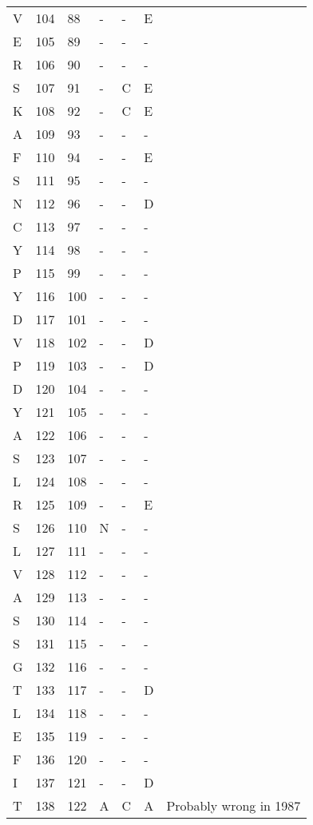 \begin{longtable}{lllllll}
  V & 104 & 88 & - & - & E &  \\ 
  E & 105 & 89 & - & - & - &  \\ 
  R & 106 & 90 & - & - & - &  \\ 
  S & 107 & 91 & - & C & E &  \\ 
  K & 108 & 92 & - & C & E &  \\ 
  A & 109 & 93 & - & - & - &  \\ 
  F & 110 & 94 & - & - & E &  \\ 
  S & 111 & 95 & - & - & - &  \\ 
  N & 112 & 96 & - & - & D &  \\ 
  C & 113 & 97 & - & - & - &  \\ 
  Y & 114 & 98 & - & - & - &  \\ 
  P & 115 & 99 & - & - & - &  \\ 
  Y & 116 & 100 & - & - & - &  \\ 
  D & 117 & 101 & - & - & - &  \\ 
  V & 118 & 102 & - & - & D &  \\ 
  P & 119 & 103 & - & - & D &  \\ 
  D & 120 & 104 & - & - & - &  \\ 
  Y & 121 & 105 & - & - & - &  \\ 
  A & 122 & 106 & - & - & - &  \\ 
  S & 123 & 107 & - & - & - &  \\ 
  L & 124 & 108 & - & - & - &  \\ 
  R & 125 & 109 & - & - & E &  \\ 
  S & 126 & 110 & N & - & - &  \\ 
  L & 127 & 111 & - & - & - &  \\ 
  V & 128 & 112 & - & - & - &  \\ 
  A & 129 & 113 & - & - & - &  \\ 
  S & 130 & 114 & - & - & - &  \\ 
  S & 131 & 115 & - & - & - &  \\ 
  G & 132 & 116 & - & - & - &  \\ 
  T & 133 & 117 & - & - & D &  \\ 
  L & 134 & 118 & - & - & - &  \\ 
  E & 135 & 119 & - & - & - &  \\ 
  F & 136 & 120 & - & - & - &  \\ 
  I & 137 & 121 & - & - & D &  \\ 
  T & 138 & 122 & A & C & A & Probably wrong in 1987 \\ 

\end{longtable}
